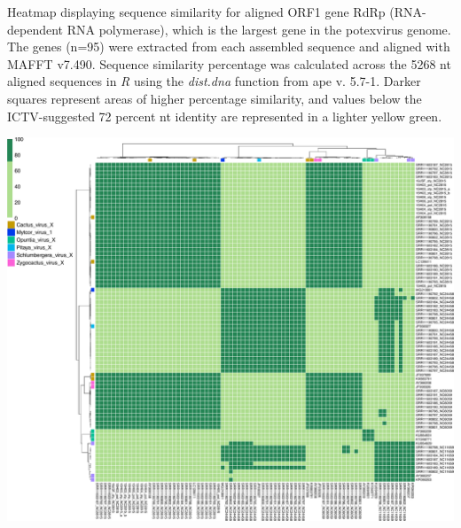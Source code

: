 \documentclass[11pt]{article}
\begin{document}
\begin{suppfigure}
\centering
\caption{
Heatmap displaying sequence similarity for aligned ORF1 gene RdRp (RNA-dependent RNA polymerase), which is the largest gene in the potexvirus genome. The genes (n=95) were extracted from each assembled sequence and aligned with MAFFT v7.490. Sequence similarity percentage was calculated across the 5268 nt aligned sequences in \textit{R} using the \textit{dist.dna} function from ape v. 5.7-1. Darker squares represent areas of higher percentage similarity, and values below the ICTV-suggested 72 percent nt identity are represented in a lighter yellow green.
}
\includegraphics[width=1\textwidth]{figures/heatmap_rdrp.pdf}
\label{fig:heat}
\end{suppfigure}
\clearpage
\end{document}
